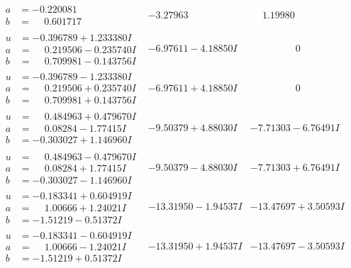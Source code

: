 \documentclass[1p]{elsarticle_modified}
\theoremstyle{definition}
\begin{document}
$$\begin{array}{c|c|c}
\begin{aligned}
a &= -0.220081\phantom{ +0.000000I} \\
b &= \phantom{-}0.601717\phantom{ +0.000000I}\end{aligned}
 & -3.27963\phantom{ +0.000000I} & \phantom{-}1.19980\phantom{ +0.000000I} \\ \hline\begin{aligned}
u &= -0.396789 + 1.233380 I \\
a &= \phantom{-}0.219506 - 0.235740 I \\
b &= \phantom{-}0.709981 - 0.143756 I\end{aligned}
 & -6.97611 - 4.18850 I & \phantom{-0.000000 } 0 \\ \hline\begin{aligned}
u &= -0.396789 - 1.233380 I \\
a &= \phantom{-}0.219506 + 0.235740 I \\
b &= \phantom{-}0.709981 + 0.143756 I\end{aligned}
 & -6.97611 + 4.18850 I & \phantom{-0.000000 } 0 \\ \hline\begin{aligned}
u &= \phantom{-}0.484963 + 0.479670 I \\
a &= \phantom{-}0.08284 - 1.77415 I \\
b &= -0.303027 + 1.146960 I\end{aligned}
 & -9.50379 + 4.88030 I & -7.71303 - 6.76491 I \\ \hline\begin{aligned}
u &= \phantom{-}0.484963 - 0.479670 I \\
a &= \phantom{-}0.08284 + 1.77415 I \\
b &= -0.303027 - 1.146960 I\end{aligned}
 & -9.50379 - 4.88030 I & -7.71303 + 6.76491 I \\ \hline\begin{aligned}
u &= -0.183341 + 0.604919 I \\
a &= \phantom{-}1.00666 + 1.24021 I \\
b &= -1.51219 - 0.51372 I\end{aligned}
 & -13.31950 - 1.94537 I & -13.47697 + 3.50593 I \\ \hline\begin{aligned}
u &= -0.183341 - 0.604919 I \\
a &= \phantom{-}1.00666 - 1.24021 I \\
b &= -1.51219 + 0.51372 I\end{aligned}
 & -13.31950 + 1.94537 I & -13.47697 - 3.50593 I \\ \hline\begin{aligned}

\end{aligned}
\end{array}$$
\end{document}
